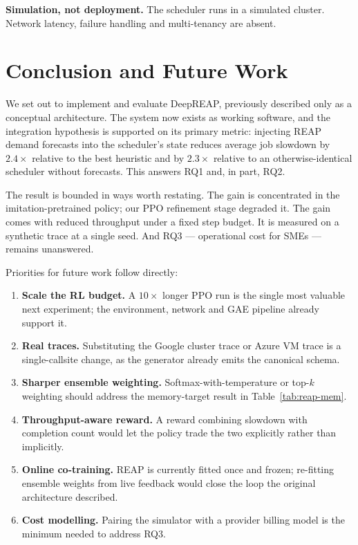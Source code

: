 \documentclass[runningheads]{llncs}
\begin{document}
\textbf{Simulation, not deployment.} The scheduler runs in a
simulated cluster. Network latency, failure handling and multi-tenancy
are absent.

\section{Conclusion and Future Work}
\label{sec:future}

We set out to implement and evaluate DeepREAP, previously described
only as a conceptual architecture. The system now exists as working
software, and the integration hypothesis is supported on its primary
metric: injecting REAP demand forecasts into the scheduler's state
reduces average job slowdown by $2.4\times$ relative to the best
heuristic and by $2.3\times$ relative to an otherwise-identical
scheduler without forecasts. This answers RQ1 and, in part, RQ2.

The result is bounded in ways worth restating. The gain is
concentrated in the imitation-pretrained policy; our PPO refinement
stage degraded it. The gain comes with reduced throughput under a
fixed step budget. It is measured on a synthetic trace at a single
seed. And RQ3 --- operational cost for SMEs --- remains unanswered.

Priorities for future work follow directly:

\begin{enumerate}
\item \textbf{Scale the RL budget.} A $10\times$ longer PPO run is the
single most valuable next experiment; the environment, network and GAE
pipeline already support it.
\item \textbf{Real traces.} Substituting the Google cluster trace or
Azure VM trace is a single-callsite change, as the generator already
emits the canonical schema.
\item \textbf{Sharper ensemble weighting.} Softmax-with-temperature or
top-$k$ weighting should address the memory-target result in
Table~\ref{tab:reap-mem}.
\item \textbf{Throughput-aware reward.} A reward combining slowdown
with completion count would let the policy trade the two explicitly
rather than implicitly.
\item \textbf{Online co-training.} REAP is currently fitted once and
frozen; re-fitting ensemble weights from live feedback would close the
loop the original architecture described.
\item \textbf{Cost modelling.} Pairing the simulator with a provider
billing model is the minimum needed to address RQ3.
\end{enumerate}
\end{document}
